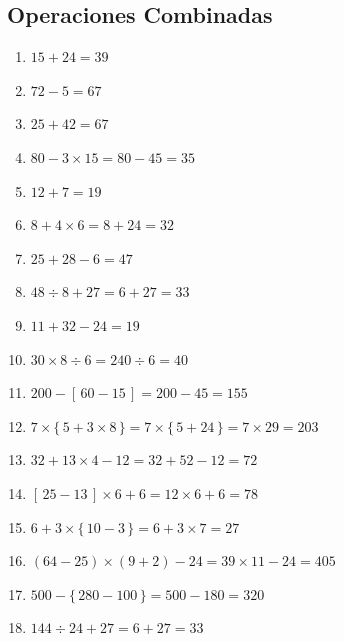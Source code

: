 \documentclass[12pt, letterpaper]{article}
\begin{document}
  \subsection*{Operaciones Combinadas}
  \begin{enumerate}[leftmargin=*, label=\textbf{\arabic*.}]
    \item $15 + 24 = 39$
    \item $72 - 5 = 67$
    \item $25 + 42 = 67$
    \item $80 - 3 \times 15 = 80 - 45 = 35$
    \item $12 + 7 = 19$
    \item $8 + 4 \times 6 = 8 + 24 = 32$
    \item $25 + 28 - 6 = 47$
    \item $48 \div 8 + 27 = 6 + 27 = 33$
    \item $11 + 32 - 24 = 19$
    \item $30 \times 8 \div 6 = 240 \div 6 = 40$
    \item $200 - [\,60 - 15\,] = 200 - 45 = 155$
    \item $7 \times \{\,5 + 3 \times 8\,\} = 7 \times \{\,5 + 24\,\} = 7 \times 29 = 203$
    \item $32 + 13 \times 4 - 12 = 32 + 52 - 12 = 72$
    \item $[\,25 - 13\,] \times 6 + 6 = 12 \times 6 + 6 = 78$
    \item $6 + 3 \times \{\,10 - 3\,\} = 6 + 3 \times 7 = 27$
    \item $(64 - 25) \times (9 + 2) - 24 = 39 \times 11 - 24 = 405$
    \item $500 - \{\,280 - 100\,\} = 500 - 180 = 320$
    \item $144 \div 24 + 27 = 6 + 27 = 33$
  \end{enumerate}
\end{document}
